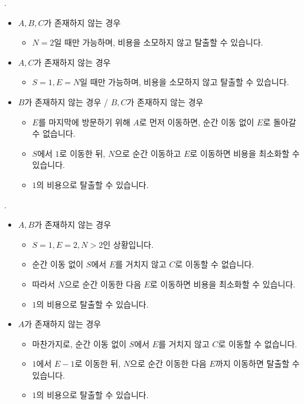 \begin{frame}{\probno{}. \probtitle{}}
    \begin{itemize}
        \item $A, B, C$가 존재하지 않는 경우
        \begin{itemize}
            \item $N = 2$일 때만 가능하며, 비용을 소모하지 않고 탈출할 수 있습니다.
        \end{itemize}
        \vspace{2mm}
        \item $A, C$가 존재하지 않는 경우
        \begin{itemize}
            \item $S = 1, E = N$일 때만 가능하며, 비용을 소모하지 않고 탈출할 수 있습니다.
        \end{itemize}
        \vspace{2mm}
        \item $B$가 존재하지 않는 경우 / $B, C$가 존재하지 않는 경우
        \begin{itemize}
            \item $E$를 마지막에 방문하기 위해 $A$로 먼저 이동하면, 순간 이동 없이 $E$로 돌아갈 수 없습니다.
            \item $S$에서 $1$로 이동한 뒤, $N$으로 순간 이동하고 $E$로 이동하면 비용을 최소화할 수 있습니다.
            \item $1$의 비용으로 탈출할 수 있습니다.
        \end{itemize}
    \end{itemize}
\end{frame}

\begin{frame}{\probno{}. \probtitle{}}
    \begin{itemize}
        \item $A, B$가 존재하지 않는 경우
        \begin{itemize}
            \item $S = 1, E = 2, N > 2$인 상황입니다.
            \item 순간 이동 없이 $S$에서 $E$를 거치지 않고 $C$로 이동할 수 없습니다.
            \item 따라서 $N$으로 순간 이동한 다음 $E$로 이동하면 비용을 최소화할 수 있습니다.
            \item $1$의 비용으로 탈출할 수 있습니다.
        \end{itemize}
        \vspace{2mm}
        \item $A$가 존재하지 않는 경우
        \begin{itemize}
            \item 마찬가지로, 순간 이동 없이 $S$에서 $E$를 거치지 않고 $C$로 이동할 수 없습니다.
            \item $1$에서 $E-1$로 이동한 뒤, $N$으로 순간 이동한 다음 $E$까지 이동하면 탈출할 수 있습니다.
            \item $1$의 비용으로 탈출할 수 있습니다.
        \end{itemize}
    \end{itemize}
\end{frame}


